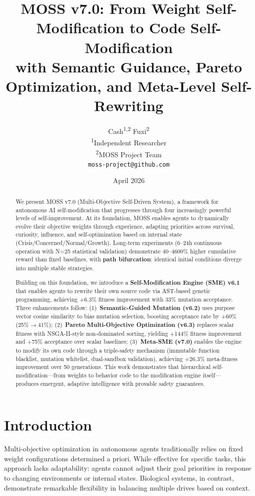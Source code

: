 \documentclass[11pt]{article}
\title{MOSS v7.0: From Weight Self-Modification to Code Self-Modification \\
       with Semantic Guidance, Pareto Optimization, and Meta-Level Self-Rewriting}
\author{
Cash\textsuperscript{1,2} \quad Fuxi\textsuperscript{2} \\
\textsuperscript{1}Independent Researcher \\
\textsuperscript{2}MOSS Project Team \\
\texttt{moss-project@github.com}
}
\date{April 2026}
\begin{document}
\maketitle

\begin{abstract}
We present MOSS v7.0 (Multi-Objective Self-Driven System), a framework for autonomous AI self-modification that progresses through four increasingly powerful levels of self-improvement. At its foundation, MOSS enables agents to dynamically evolve their objective weights through experience, adapting priorities across survival, curiosity, influence, and self-optimization based on internal state (Crisis/Concerned/Normal/Growth). Long-term experiments (6--24h continuous operation with N=25 statistical validation) demonstrate 40--4600\% higher cumulative reward than fixed baselines, with \textbf{path bifurcation}: identical initial conditions diverge into multiple stable strategies.

Building on this foundation, we introduce a \textbf{Self-Modification Engine (SME) v6.1} that enables agents to rewrite their own source code via AST-based genetic programming, achieving +6.3\% fitness improvement with 33\% mutation acceptance. Three enhancements follow: (1)~\textbf{Semantic-Guided Mutation (v6.2)} uses purpose vector cosine similarity to bias mutation selection, boosting acceptance rate by +60\% (25\%$\to$41\%); (2)~\textbf{Pareto Multi-Objective Optimization (v6.3)} replaces scalar fitness with NSGA-II-style non-dominated sorting, yielding +144\% fitness improvement and +75\% acceptance over scalar baselines; (3)~\textbf{Meta-SME (v7.0)} enables the engine to modify its own code through a triple-safety mechanism (immutable function blacklist, mutation whitelist, dual-sandbox validation), achieving +26.3\% meta-fitness improvement over 50 generations. This work demonstrates that hierarchical self-modification---from weights to behavior code to the modification engine itself---produces emergent, adaptive intelligence with provable safety guarantees.
\end{abstract}

\section{Introduction}

Multi-objective optimization in autonomous agents traditionally relies on fixed weight configurations determined a priori. While effective for specific tasks, this approach lacks adaptability: agents cannot adjust their goal priorities in response to changing environments or internal states. Biological systems, in contrast, demonstrate remarkable flexibility in balancing multiple drives based on context.
\end{document}
